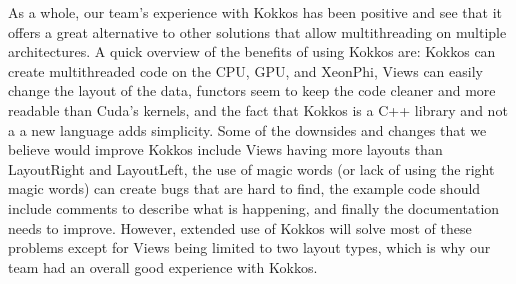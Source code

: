 As a whole, our team's experience with Kokkos has been positive and see that it
offers a great alternative to other solutions that allow multithreading on
multiple architectures. A quick overview of the benefits of using Kokkos are:
Kokkos can create multithreaded code on the CPU, GPU, and XeonPhi, Views can
easily change the layout of the data, functors seem to keep the code cleaner
and more readable than Cuda's kernels, and the fact that Kokkos is a C++
library and not a a new language adds simplicity. Some of the downsides and
changes that we believe would improve Kokkos include Views having more layouts
than LayoutRight and LayoutLeft, the use of magic words (or lack of using the
right magic words) can create bugs that are hard to find, the example code
should include comments to describe what is happening, and finally the
documentation needs to improve. However, extended use of Kokkos will solve most
of these problems except for Views being limited to two layout types, which is
why our team had an overall good experience with Kokkos.





